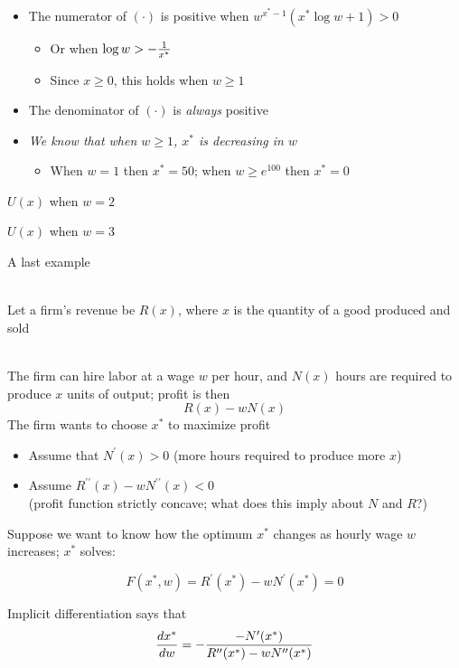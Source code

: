 \documentclass[10pt]{seminar}
\begin{document}
\begin{slide}
\begin{itemize}
\item The numerator of $(\cdot)$ is positive when $w^{x^*-1} (x^* \log{w}+1)>0$
\begin{itemize}
\item Or when $\log{w}>-{1\over{x^*}}$
\item Since $x\geq 0$, this holds when $w\geq 1$
\end{itemize}
\item The denominator of $(\cdot)$ is \textit{always} positive
\item \textit{We know that when $w \geq 1$, $x^*$ is decreasing in $w$}
\begin{itemize}
\item When $w=1$ then $x^*=50$; when $w\geq e^{100}$ then $x^*=0$
\end{itemize}
\end{itemize}
\newslide
\begin{center}

$U(x)$ when $w=2$

$U(x)$ when $w=3$
\end{center}
\newslide
A last example

\ \\Let a firm's revenue be $R(x)$, where $x$ is the quantity of a good produced and sold

\ \\The firm can hire labor at a wage $w$ per hour, and $N(x)$ hours are required to produce $x$ units of output; profit is then $$R(x)-wN(x)$$ The firm wants to choose $x^*$ to maximize profit

\begin{itemize}
\item Assume that $N^\prime(x)>0$ (more hours required to produce more $x$)
\item Assume $R^{\prime\prime}(x)-wN^{\prime\prime}(x)<0$ \\(profit function strictly concave; what does this imply about $N$ and $R$?)
\end{itemize}

\newslide
Suppose we want to know how the optimum $x^*$ changes as hourly wage $w$ increases; $x^*$ solves:

$$F(x^*, w)=R^\prime(x^*)-wN^\prime(x^*)=0$$

Implicit differentiation says that $${{dx^*}\over{dw}}=-{{-N^\prime(x^*)}\over{R^{\prime\prime}(x^*)-wN^{\prime\prime}(x^*)}}$$


\end{slide}
\end{document}
